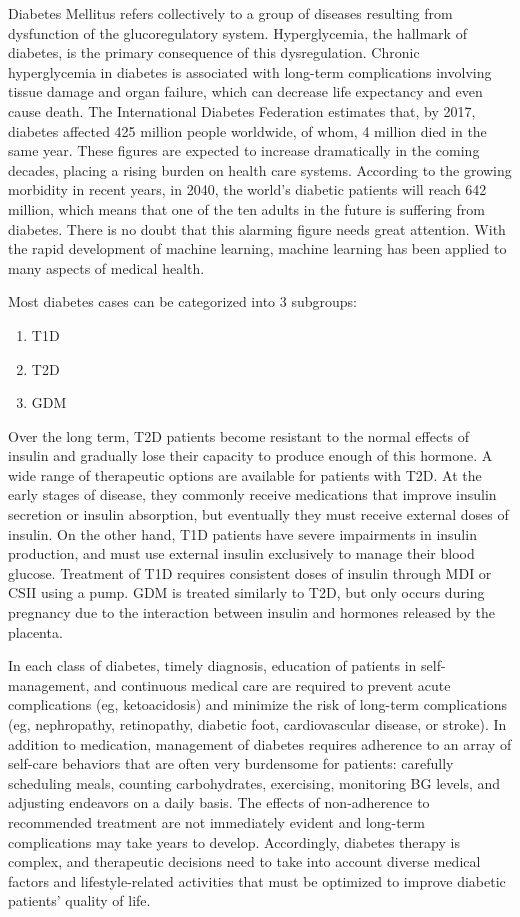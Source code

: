 \documentclass[12pt]{article}
\begin{document}
Diabetes Mellitus refers collectively to a group of diseases resulting from dysfunction of the glucoregulatory system. Hyperglycemia, the hallmark of diabetes, is the primary consequence of this dysregulation. Chronic hyperglycemia in diabetes is associated with long-term complications involving tissue damage and organ failure, which can decrease life expectancy and even cause death. The International Diabetes Federation estimates that, by 2017, diabetes affected 425 million people worldwide, of whom, 4 million died in the same year. These figures are expected to increase dramatically in the coming decades, placing a rising burden on health care systems. According to the growing morbidity in recent years, in 2040, the world’s diabetic patients will reach 642 million, which means that one of the ten adults in the future is suffering from diabetes. There is no doubt that this alarming figure needs great attention. With the rapid development of machine learning, machine learning has been applied to many aspects of medical health.\cite{DBTW}

Most diabetes cases can be categorized into 3 subgroups: 
\begin{enumerate}
\item T1D
\item T2D
\item GDM
\end{enumerate}

Over the long term, T2D patients become resistant to the normal effects of insulin and gradually lose their capacity to produce enough of this hormone. A wide range of therapeutic options are available for patients with T2D. At the early stages of disease, they commonly receive medications that improve insulin secretion or insulin absorption, but eventually they must receive external doses of insulin. On the other hand, T1D patients have severe impairments in insulin production, and must use external insulin exclusively to manage their blood glucose. Treatment of T1D requires consistent doses of insulin through MDI or CSII using a pump. GDM is treated similarly to T2D, but only occurs during pregnancy due to the interaction between insulin and hormones released by the placenta.

In each class of diabetes, timely diagnosis, education of patients in self-management, and continuous medical care are required to prevent acute complications (eg, ketoacidosis) and minimize the risk of long-term complications (eg, nephropathy, retinopathy, diabetic foot, cardiovascular disease, or stroke). In addition to medication, management of diabetes requires adherence to an array of self-care behaviors that are often very burdensome for patients: carefully scheduling meals, counting carbohydrates, exercising, monitoring BG levels, and adjusting endeavors on a daily basis. The effects of non-adherence to recommended treatment are not immediately evident and long-term complications may take years to develop. Accordingly, diabetes therapy is complex, and therapeutic decisions need to take into account diverse medical factors and lifestyle-related activities that must be optimized to improve diabetic patients’ quality of life.
\end{document}
